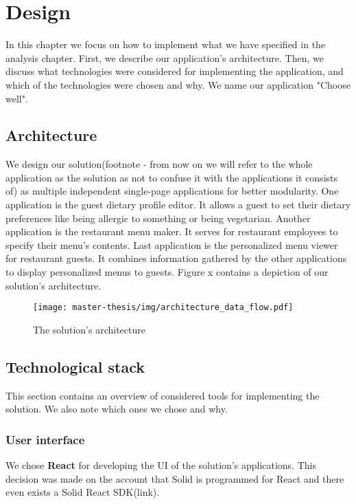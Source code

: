 \chapter{Design}
In this chapter we focus on how to implement what we have specified in the analysis chapter.
First, we describe our application's architecture.
Then, we discuss what technologies were considered for implementing the application, and which of the technologies were chosen and why.
We name our application "Choose well".

\section{Architecture}
We design our solution(footnote - from now on we will refer to the whole application as the solution as not to  confuse it with the applications it consists of) as multiple independent single-page applications for better modularity. 
One application is the guest dietary profile editor.
It allows a guest to set their dietary preferences like being allergic to something or being vegetarian.
Another application is the restaurant menu maker.
It serves for restaurant employees to specify their menu's contents.
Last application is the personalized menu viewer for restaurant guests.
It combines information gathered by the other applications to display personalized menus to guests. 
Figure x contains a depiction of our solution's architecture.

\begin{figure}[h]
  \centering
  \texttt{[image: master-thesis/img/architecture\_data\_flow.pdf]}
  \caption{The solution's architecture}
\end{figure}

\section{Technological stack}
This section contains an overview of considered tools for implementing the solution.
We also note which ones we chose and why.

\subsection*{User interface}
We chose \textbf{React} for developing the UI of the solution's applications.
This decision was made on the account that Solid is programmed for React and there even exists a Solid React SDK(link).

